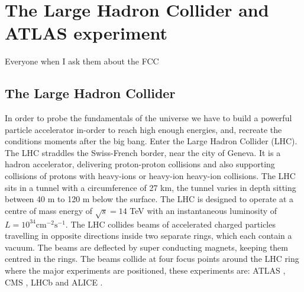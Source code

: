 \chapter{The Large Hadron Collider and ATLAS experiment}
\label{chap::LHC}

%
{Everyone when I ask them about the FCC}

\section{The Large Hadron Collider}
In order to probe the fundamentals of the universe we have to build a powerful particle accelerator in-order to reach high enough energies, and, recreate the conditions moments after the big bang. Enter the Large Hadron Collider (LHC). The LHC straddles the Swiss-French border, near the city of Geneva. It is a hadron accelerator, delivering proton-proton collisions and also supporting collisions of protons with heavy-ions or heavy-ion heavy-ion collisions. The LHC sits in a tunnel with a circumference of 27 km, the tunnel varies in depth sitting between 40 m to 120 m below the surface. The LHC is designed to operate at a centre of mass energy of $\sqrt{s}=14$ TeV with an instantaneous luminosity of $L=10^{34}\text{cm}^{-2}\text{s}^{-1}$. The LHC collides beams of accelerated charged particles travelling in opposite directions inside two separate rings, which each contain a vacuum. The beams are deflected by super conducting magnets, keeping them centred in the rings. The beams collide at four focus points around the LHC ring where the major experiments are positioned, these experiments are: ATLAS \cite{The_ATLAS_Collaboration_2008}, CMS \cite{The_CMS_Collaboration_2008}, 
LHCb \cite{The_LHCb_Collaboration_2008} and ALICE \cite{The_ALICE_Collaboration_2008}.



